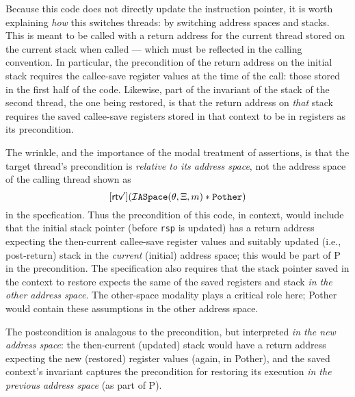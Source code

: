 Because this code does not directly update the instruction pointer, it is worth explaining \emph{how} this switches threads: by switching address spaces and stacks. 
This is meant to be called with a return address for the current thread stored on the current stack when called --- which must be reflected in the calling convention. 
In particular, the precondition of the return address on the initial stack requires the callee-save register values at the time of the call: those stored in the first 
half of the code.
Likewise, part of the invariant of the stack of the second thread, the one being restored, is that the return address on \emph{that} stack requires the saved 
callee-save registers stored in that context to be in registers as its precondition.

The wrinkle, and the importance of the modal treatment of assertions, is that the target thread's precondition is \emph{relative to its address space}, 
not the address space of the calling thread shown as 
\[[\textsf{rtv}'](\mathcal{I}\texttt{ASpace}(\theta,\Xi,m) \ast \texttt{Pother})\]
in the specfication. 
Thus the precondition of this code,
in context, would include that the initial stack pointer (before \lstinline|rsp| is updated)
has a return address expecting the then-current callee-save register values and 
suitably updated (i.e., post-return) stack in the \emph{current} (initial) address space;
this would be part of \textsf{P} in the precondition.
The specification also requires that
the stack pointer saved in the context to restore expects the same of the saved registers and stack 
\emph{in the other address space}. 
The other-space modality plays a critical role here; \textsf{Pother} would contain these assumptions in the other
address space.


The postcondition is analagous to the precondition, but interpreted \emph{in the new address space}: the then-current (updated) stack would have a return address expecting the new (restored) register values (again, in \textsf{Pother}),
and the saved context's invariant captures the precondition for restoring its execution \emph{in the previous address space} (as part of \textsf{P}). 

